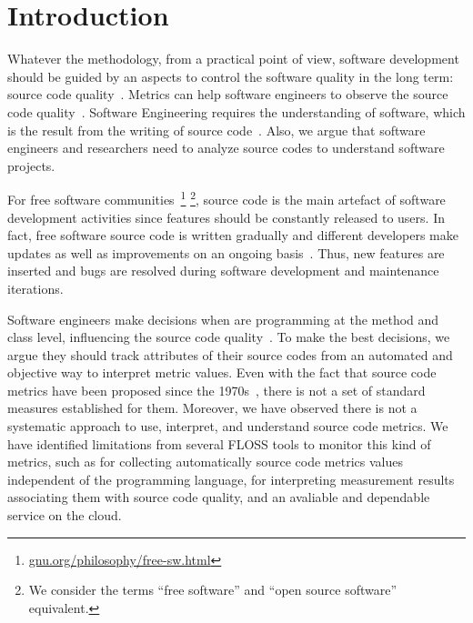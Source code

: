 \section{Introduction}
\label{introduction}


Whatever the methodology, from a practical point of view, software development
should be guided by an aspects to control the software quality in the long
term: source code quality~\cite{martin2008}. Metrics can help software
engineers to observe the source code quality~\cite{SEI88}. Software Engineering
requires the understanding of software, which is the result from the writing of
source code~\cite{martin2008}. Also, we argue that software engineers and
researchers need to analyze source codes to understand software projects.

For free software communities~\footnote{\url{gnu.org/philosophy/free-sw.html}}
\footnote{We consider the terms ``free software'' and ``open source software''
equivalent.}, source code is the main artefact of software development
activities since features should be constantly released to users. In fact,
free software source code is written gradually and different developers make
updates as well as improvements on an ongoing basis~\cite{martin2008}. Thus,
new features are inserted and bugs are resolved during software development and
maintenance iterations.

Software engineers make decisions when are programming at the method and class
level, influencing the source code quality~\cite{beck2007}. To make the best
decisions, we argue they should track attributes of their source codes from an
automated and objective way to interpret metric values. Even with the fact that
source code metrics have been proposed since the 1970s~\cite{SEI88}, there is
not a set of standard measures established for them.  Moreover, we have
observed there is not a systematic approach to use, interpret, and understand
source code metrics. We have identified limitations from several FLOSS
tools to monitor this kind of metrics, such as for collecting automatically
source code metrics values independent of the programming language, for
interpreting measurement results associating them with source code quality, and
an avaliable and dependable service on the cloud.

